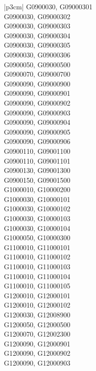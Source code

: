 \begin{customLongTable}{ |p{3cm}| }
G0900030, G09000301 \\ \hline
G0900030, G09000302 \\ \hline
G0900030, G09000303 \\ \hline
G0900030, G09000304 \\ \hline
G0900030, G09000305 \\ \hline
G0900030, G09000306 \\ \hline
G0900050, G09000500 \\ \hline
G0900070, G09000700 \\ \hline
G0900090, G09000900 \\ \hline
G0900090, G09000901 \\ \hline
G0900090, G09000902 \\ \hline
G0900090, G09000903 \\ \hline
G0900090, G09000904 \\ \hline
G0900090, G09000905 \\ \hline
G0900090, G09000906 \\ \hline
G0900110, G09001100 \\ \hline
G0900110, G09001101 \\ \hline
G0900130, G09001300 \\ \hline
G0900150, G09001500 \\ \hline
G1000010, G10000200 \\ \hline
G1000030, G10000101 \\ \hline
G1000030, G10000102 \\ \hline
G1000030, G10000103 \\ \hline
G1000030, G10000104 \\ \hline
G1000050, G10000300 \\ \hline
G1100010, G11000101 \\ \hline
G1100010, G11000102 \\ \hline
G1100010, G11000103 \\ \hline
G1100010, G11000104 \\ \hline
G1100010, G11000105 \\ \hline
G1200010, G12000101 \\ \hline
G1200010, G12000102 \\ \hline
G1200030, G12008900 \\ \hline
G1200050, G12000500 \\ \hline
G1200070, G12002300 \\ \hline
G1200090, G12000901 \\ \hline
G1200090, G12000902 \\ \hline
G1200090, G12000903 \\ \hline

\end{customLongTable}
